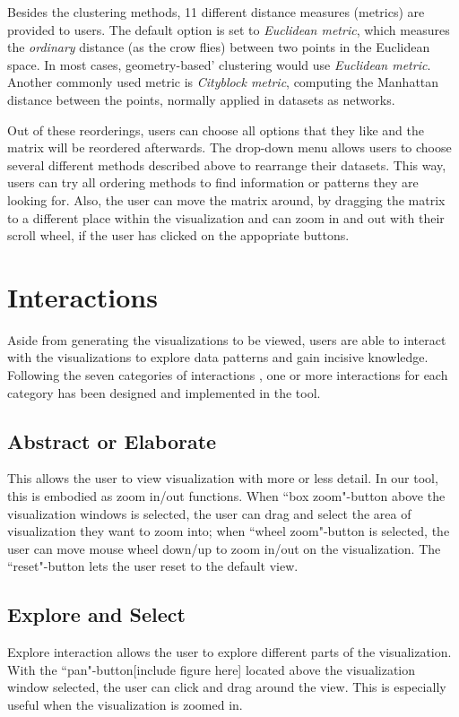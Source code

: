 \documentclass[journal]{vgtc}                %
\begin{document}
Besides the clustering methods, 11 different distance measures (metrics) are provided to users. The default option is set to \textit{Euclidean metric}, which measures the \textit{ordinary} distance (as the crow flies) between two points in the Euclidean space. In most cases, geometry-based'  clustering would use \textit{Euclidean metric}. Another commonly used metric is \textit{Cityblock metric}, computing the Manhattan distance between the points, normally applied in datasets as networks.\cite{DBLP:journals/corr/BoraG14a}

Out of these reorderings, users can choose all options that they like and the matrix will be reordered afterwards. The drop-down menu allows users to choose several different methods described above to rearrange their datasets. This way, users can try all ordering methods to find information or patterns they are looking for. Also, the user can move the matrix around, by dragging the matrix to a different place within the visualization and can zoom in and out with their scroll wheel, if the user has clicked on the appopriate buttons.

\section{Interactions} %
Aside from generating the visualizations to be viewed, users are able to interact with the visualizations to explore data patterns and gain incisive knowledge. Following the seven categories of interactions \cite{Yi:2007}, one or more interactions for each category has been designed and implemented in the tool.

\subsection{Abstract or Elaborate}
This allows the user to view visualization with more or less detail. \cite{Yi:2007} In our tool, this is embodied as zoom in/out functions. When ``box zoom"-button above the visualization windows is selected, the user can drag and select the area of visualization they want to zoom into; when ``wheel zoom"-button is selected, the user can move mouse wheel down/up to zoom in/out on the visualization. The ``reset"-button lets the user reset to the default view. 

\subsection{Explore and Select}
Explore interaction allows the user to explore different parts of the visualization.\cite{Yi:2007}  With the ``pan"-button[include figure here] located above the visualization window selected, the user can click and drag around the view. This is especially useful when the visualization is zoomed in. 
\end{document}
